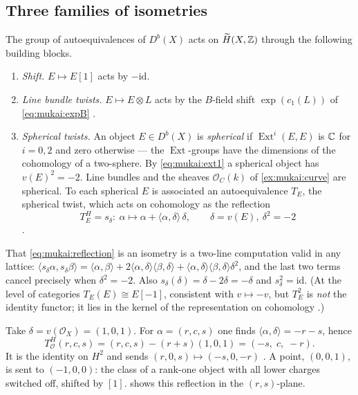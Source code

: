 \subsection{Three families of isometries}
The group of autoequivalences of $D^b(X)$ acts on $\widetilde H(X,\mathbb{Z})$ through the following
building blocks.
\begin{enumerate}[leftmargin=*,label=(\roman*)]
\item \emph{Shift.} $E\mapsto E[1]$ acts by $-\mathrm{id}$.
\item \emph{Line bundle twists.} $E\mapsto E\otimes L$ acts by the $B$-field shift
  $\exp(c_1(L))$ of \eqref{eq:mukai:expB} .
\item \emph{Spherical twists.} An object
  $E\in D^b(X)$ is \emph{spherical} if $\operatorname{Ext}^i(E,E)$ is $\mathbb{C}$ for $i=0,2$ and zero
  otherwise --- the $\operatorname{Ext}$-groups have the dimensions of the cohomology of a
  two-sphere. By \eqref{eq:mukai:ext1} a spherical object has $v(E)^2=-2$. Line bundles and the
  sheaves $\mathcal O_C(k)$ of \cref{ex:mukai:curve} are spherical. To each spherical $E$ is
  associated an autoequivalence $T_E$, the spherical twist, which acts on cohomology as the
  reflection
  \begin{equation}\label{eq:mukai:reflection}
    T_E^H=s_{\delta}:\ \alpha\mapsto\alpha+\langle\alpha,\delta\rangle\,\delta,\qquad
    \delta=v(E),\ \delta^2=-2
  \end{equation}
  .
\end{enumerate}
That \eqref{eq:mukai:reflection} is an isometry is a two-line computation valid in any lattice:
$\langle s_\delta\alpha,s_\delta\beta\rangle=\langle\alpha,\beta\rangle
+2\langle\alpha,\delta\rangle\langle\beta,\delta\rangle
+\langle\alpha,\delta\rangle\langle\beta,\delta\rangle\delta^2$, and the last two terms cancel
precisely when $\delta^2=-2$. Also $s_\delta(\delta)=\delta-2\delta=-\delta$ and $s_\delta^2=
\mathrm{id}$. (At the level of categories $T_E(E)\cong E[-1]$, consistent with
$v\mapsto-v$, but $T_E^2$ is \emph{not} the identity functor; it lies in the kernel of the
representation on cohomology .)

\begin{example}\label{ex:mukai:TO}
Take $\delta=v(\mathcal O_X)=(1,0,1)$. For $\alpha=(r,c,s)$ one finds
$\langle\alpha,\delta\rangle=-r-s$, hence
\begin{equation}\label{eq:mukai:TO}
  T^H_{\mathcal O}(r,c,s)=(r,c,s)-(r+s)(1,0,1)=(-s,\;c,\;-r).
\end{equation}
It is the identity on $H^2$ and sends $(r,0,s)\mapsto(-s,0,-r)$
. A point, $(0,0,1)$, is sent to
$(-1,0,0)$: the class of a rank-one object with all lower charges switched off, shifted by
$[1]$.  shows this reflection in the $(r,s)$-plane.
\end{example}

